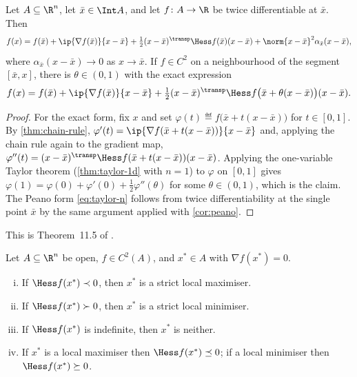 \begin{theorem}\label{thm:taylor-n}
	Let $A\subseteq\R^n$, let $\bar x\in\Int A$, and let $f\colon A\to\R$ be twice
	differentiable at $\bar x$. Then
	\begin{equation}\label{eq:taylor-n}
		f(x)=f(\bar x)+\ip{\nabla f(\bar x)}{x-\bar x}
		+\tfrac12(x-\bar x)^{\transp}\Hess f(\bar x)(x-\bar x)
		+\norm{x-\bar x}^2\alpha_{\bar x}(x-\bar x),
	\end{equation}
	where $\alpha_{\bar x}(x-\bar x)\to0$ as $x\to\bar x$. If $f\in C^2$ on a
	neighbourhood of the segment $[\bar x,x]$, there is
	$\theta\in(0,1)$ with the exact expression
	\[
		f(x)=f(\bar x)+\ip{\nabla f(\bar x)}{x-\bar x}
		+\tfrac12(x-\bar x)^{\transp}\Hess f\bigl(\bar x+\theta(x-\bar x)\bigr)(x-\bar x).
	\]
\end{theorem}

\begin{proof}
	For the exact form, fix $x$ and set $\varphi(t)\eqdef f\bigl(\bar
		x+t(x-\bar x)\bigr)$ for $t\in[0,1]$. By \autoref{thm:chain-rule},
	$\varphi'(t)=\ip{\nabla f(\bar x+t(x-\bar x))}{x-\bar x}$ and, applying the
	chain rule again to the gradient map,
	$\varphi''(t)=(x-\bar x)^{\transp}\Hess f(\bar x+t(x-\bar x))(x-\bar x)$.
	Applying the one-variable Taylor theorem
	(\autoref{thm:taylor-1d} with $n=1$) to $\varphi$ on $[0,1]$ gives
	$\varphi(1)=\varphi(0)+\varphi'(0)+\tfrac12\varphi''(\theta)$ for some
	$\theta\in(0,1)$, which is the claim. The Peano form \eqref{eq:taylor-n} follows
	from twice differentiability at the single point $\bar x$ by the same argument
	applied with \autoref{cor:peano}.
\end{proof}

This is Theorem~11.5 of \textcite[p.~413]{fukuda2026notes}.

\begin{theorem}\label{thm:second-order-conditions}
	Let $A\subseteq\R^n$ be open, $f\in C^2(A)$, and $x^\ast\in A$ with
	$\nabla f(x^\ast)=0$.
	\begin{enumerate}[(i)]
		\item If $\Hess f(x^\ast)\prec0$, then $x^\ast$ is a strict local maximiser.
		\item If $\Hess f(x^\ast)\succ0$, then $x^\ast$ is a strict local minimiser.
		\item If $\Hess f(x^\ast)$ is indefinite, then $x^\ast$ is neither.
		\item If $x^\ast$ is a local maximiser then $\Hess f(x^\ast)\preceq0$; if a
		      local minimiser then $\Hess f(x^\ast)\succeq0$.
	\end{enumerate}
\end{theorem}

